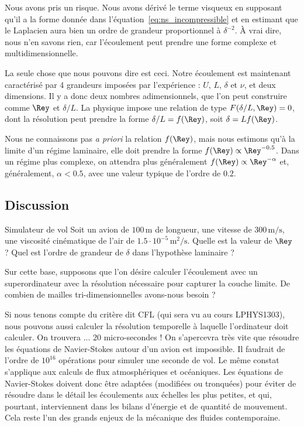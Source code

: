 \begin{redmargin}
  Nous avons pris un risque. Nous avons dérivé le terme visqueux en supposant qu'il a la forme donnée dans l'équation~\eqref{eq:ns_incompressible} et en estimant que le Laplacien aura bien un ordre de grandeur proportionnel à $\delta^{-2}$. À vrai dire, nous n'en savons rien, car l'écoulement peut prendre une forme complexe et multidimensionnelle.

  La seule chose que nous pouvons dire est ceci. Notre écoulement est maintenant caractérisé par 4 grandeurs imposées par l'expérience : $U$, $L$, $\delta$ et $\nu$, et deux dimensions. Il y a donc deux nombres adimensionnels, que l'on peut construire comme $\Rey$ et $\delta/L$. La physique impose une relation de type $F(\delta/L, \Rey) = 0$, dont la résolution peut prendre la forme $\delta/L = f(\Rey)$, soit $\delta = L f(\Rey)$.

  Nous ne connaissons pas \emph{a priori} la relation $f(\Rey)$, mais nous estimons qu'à la limite d'un régime laminaire, elle doit prendre la forme $f(\Rey) \propto \Rey^{-0.5}$. Dans un régime plus complexe, on attendra plus généralement $f(\Rey) \propto \Rey^{-\alpha}$ et, généralement, $\alpha < 0.5$, avec une valeur typique de l'ordre de $0.2$.
\end{redmargin}

\subsection{Discussion}
\begin{studentinvestigation}{Simulateur de vol}
  Soit un avion de $100\,\mathrm{m}$ de longueur, une vitesse de $300\,\mathrm{m/s}$, une viscosité cinématique de l'air de $1.5 \cdot 10^{-5}\,\mathrm{m}^2/\mathrm{s}$. Quelle est la valeur de $\Rey$ ? Quel est l'ordre de grandeur de $\delta$ dans l'hypothèse laminaire ?

  Sur cette base, supposons que l'on désire calculer l'écoulement avec un superordinateur avec la résolution nécessaire pour capturer la couche limite. De combien de mailles tri-dimensionnelles avons-nous besoin ?
\end{studentinvestigation}

Si nous tenons compte du critère dit CFL (qui sera vu au cours LPHYS1303), nous pouvons aussi calculer la résolution temporelle à laquelle l'ordinateur doit calculer. On trouvera ... 20 micro-secondes ! On s'apercevra très vite que résoudre les équations de Navier-Stokes autour d'un avion est impossible. Il faudrait de l'ordre de $10^{16}$ opérations pour simuler une seconde de vol. Le même constat s'applique aux calculs de flux atmosphériques et océaniques. Les équations de Navier-Stokes doivent donc être adaptées (modifiées ou tronquées) pour éviter de résoudre dans le détail les écoulements aux échelles les plus petites, et qui, pourtant, interviennent dans les bilans d'énergie et de quantité de mouvement. Cela reste l'un des grands enjeux de la mécanique des fluides contemporaine.


